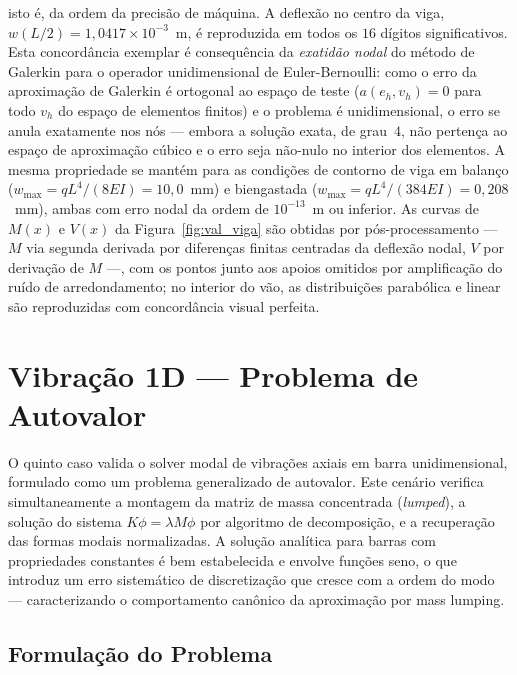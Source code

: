 \noindent isto é, da ordem da precisão de máquina. A deflexão no centro da viga, $w(L/2) = 1{,}0417 \times 10^{-3}$~m, é reproduzida em todos os $16$ dígitos significativos. Esta concordância exemplar é consequência da \emph{exatidão nodal} do método de Galerkin para o operador unidimensional de Euler-Bernoulli: como o erro da aproximação de Galerkin é ortogonal ao espaço de teste ($a(e_h, v_h) = 0$ para todo $v_h$ do espaço de elementos finitos) e o problema é unidimensional, o erro se anula exatamente nos nós --- embora a solução exata, de grau~$4$, não pertença ao espaço de aproximação cúbico e o erro seja não-nulo no interior dos elementos. A mesma propriedade se mantém para as condições de contorno de viga em balanço ($w_{\max} = qL^4/(8EI) = 10{,}0$~mm) e biengastada ($w_{\max} = qL^4/(384EI) = 0{,}208$~mm), ambas com erro nodal da ordem de $10^{-13}$~m ou inferior. As curvas de $M(x)$ e $V(x)$ da Figura~\ref{fig:val_viga} são obtidas por pós-processamento --- $M$ via segunda derivada por diferenças finitas centradas da deflexão nodal, $V$ por derivação de $M$ ---, com os pontos junto aos apoios omitidos por amplificação do ruído de arredondamento; no interior do vão, as distribuições parabólica e linear são reproduzidas com concordância visual perfeita.


\section{Vibração 1D --- Problema de Autovalor}
\label{sec:val_vibracao}

O quinto caso valida o solver modal de vibrações axiais em barra unidimensional, formulado como um problema generalizado de autovalor. Este cenário verifica simultaneamente a montagem da matriz de massa concentrada (\emph{lumped}), a solução do sistema $K \phi = \lambda M \phi$ por algoritmo de decomposição, e a recuperação das formas modais normalizadas. A solução analítica para barras com propriedades constantes é bem estabelecida e envolve funções seno, o que introduz um erro sistemático de discretização que cresce com a ordem do modo --- caracterizando o comportamento canônico da aproximação por mass lumping.

\subsection{Formulação do Problema}

